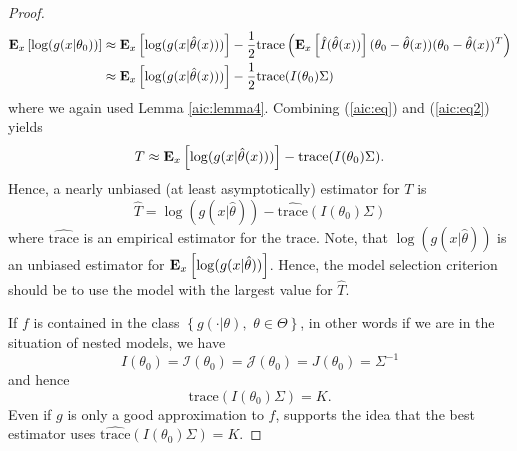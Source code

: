 \documentclass[a4paper, 12pt]{scrreprt}
\newcommand{\trace}{{\mathrm{trace}}}
\newcommand{\ew}{\mbox{\textbf{E}}}
\begin{document}
\begin{proof}
\begin{align}
\ew_x\left[ \log(g(x|\theta_0)) \right] 
&\approx \ew_x\left[ \log(g(x|\hat{\theta}(x))) \right]
- \frac{1}{2} \trace \left( \ew_x \left[ \hat{I}(\hat{\theta}(x)) \right] (\theta_0 - \hat{\theta}(x)) (\theta_0 - \hat{\theta}(x))^T \right) \nonumber \\
&\approx \ew_x\left[ \log(g(x|\hat{\theta}(x))) \right] - \frac{1}{2} \trace(I(\theta_0) \Sigma)
\label{aic:eq2}
\end{align}
where we again used Lemma \ref{aic:lemma4}.
Combining (\ref{aic:eq}) and (\ref{aic:eq2}) yields
\[
T \approx \ew_x \left[ \log(g(x|\hat{\theta}(x))) \right] - \trace(I(\theta_0) \Sigma).
\]
Hence, a nearly unbiased (at least asymptotically) estimator for $T$ is
\begin{equation}\label{aic:That}
\hat{T} = \log(g(x|\hat{\theta})) - \widehat{\trace}(I(\theta_0) \Sigma)
\end{equation}
where $\widehat{\trace}$ is an empirical estimator for the $\trace$. Note, that $\log(g(x|\hat{\theta}))$ is an unbiased estimator for $\ew_x \left[\log(g(x|\hat{\theta})) \right]$. 
Hence, the model selection criterion should be to use the model with the largest value for $\hat{T}$.

If $f$ is contained in the class $\left\{ g(\cdot|\theta), \,\, \theta\in\Theta \right\}$, in other words if we are in the situation of nested models, we have
\[ 
I(\theta_0) = \mathcal{I}(\theta_0) = \mathcal{J}(\theta_0) = J(\theta_0) = \Sigma^{-1}
\]
and hence
\[
\trace(I(\theta_0)\Sigma) = K.
\]
Even if $g$ is only a good approximation to $f$, \textcite[p. 5]{shibata1989statistical} supports the idea that the best estimator uses $\widehat{\trace}(I(\theta_0) \Sigma) = K$.


\end{proof}
\end{document}
